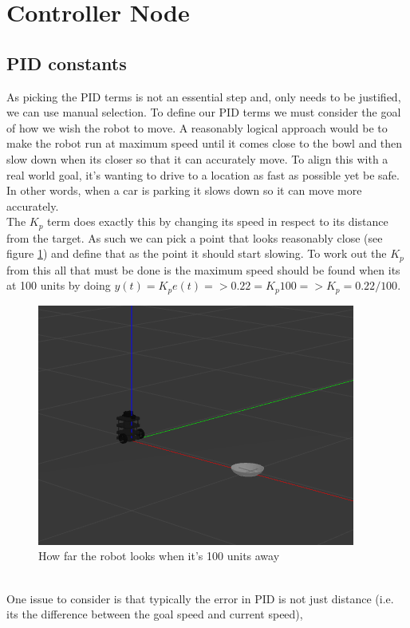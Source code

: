 \documentclass{article}
\newcommand\tab[1][1cm]{\hspace*{#1}}
\begin{document}
\section{Controller Node}\label{controllerSection}
\subsection{PID constants}
As picking the PID terms is not an essential step and, only needs to be
justified, we can use manual selection. To define our PID terms we must consider
the goal of how we wish the robot to move. A reasonably logical approach would
be to make the robot run at maximum speed until it comes close to the bowl and
then slow down when its closer so that it can accurately move. To align this
with a real world goal, it's wanting to drive to a location as fast as possible
yet be safe. In other words, when a car is parking it slows down so it can move
more accurately.
\\
\tab The $K_p$ term does exactly this by changing its speed in respect to its
distance from the target. As such we can pick a point that looks reasonably
close (see figure \ref{100units}) and define that as the point it should start
slowing. To work out the $K_p$ from this all that must be done is the maximum
speed should be found when its at 100 units by doing $y(t)=K_pe(t) => 0.22 = K_p100 =>
K_p = 0.22/100$. 
\begin{figure}[ht]
    \centering
    \includegraphics[scale=0.75]{img/100_units_away.png}
    \caption{How far the robot looks when it's 100 units away}
    \label{100units}
\end{figure}
\\
\tab One issue to consider is that typically the error in PID is not just
distance (i.e. its the difference between the goal speed and current speed),
\end{document}
